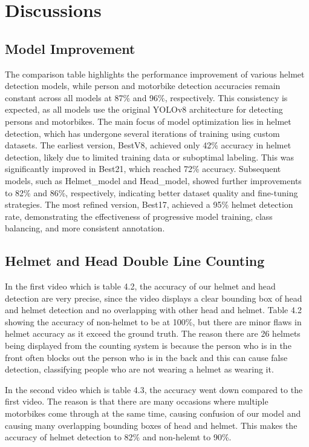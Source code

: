 \section{Discussions}

\subsection{Model Improvement}
\setlength{\parindent}{2.5em}
The comparison table highlights the performance improvement of various helmet detection models, while person and motorbike detection accuracies remain constant across all models at 87\% and 96\%, respectively. This consistency is expected, as all models use the original YOLOv8 architecture for detecting persons and motorbikes. The main focus of model optimization lies in helmet detection, which has undergone several iterations of training using custom datasets. The earliest version, BestV8, achieved only 42\% accuracy in helmet detection, likely due to limited training data or suboptimal labeling. This was significantly improved in Best21, which reached 72\% accuracy. Subsequent models, such as Helmet\_model and Head\_model, showed further improvements to 82\% and 86\%, respectively, indicating better dataset quality and fine-tuning strategies. The most refined version, Best17, achieved a 95\% helmet detection rate, demonstrating the effectiveness of progressive model training, class balancing, and more consistent annotation.
\subsection{Helmet and Head Double Line Counting}
\setlength{\parindent}{2.5em}  %
In the first video which is table 4.2, the accuracy of our helmet and head detection are very precise, since the video displays a clear bounding box of head and helmet detection and no overlapping with other head and helmet. Table 4.2 showing the accuracy of non-helmet to be at 100\%, but there are minor flaws in helmet accuracy as it exceed the ground truth. The reason there are 26 helmets being displayed from the counting system is because the person who is in the front often blocks out the person who is in the back and this can cause false detection, classifying people who are not wearing a helmet as wearing it.

In the second video which is table 4.3, the accuracy went down compared to the first video. The reason is that there are many occasions where multiple motorbikes come through at the same time, causing confusion of our model and causing many overlapping bounding boxes of head and helmet. This makes the accuracy of helmet detection to 82\% and non-helemt to 90\%.


